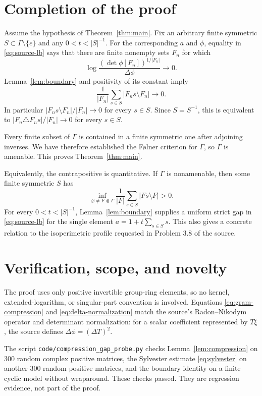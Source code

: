 \documentclass[11pt]{article}
\newcommand{\G}{\Gamma}
\begin{document}
\section{Completion of the proof}

Assume the hypothesis of Theorem~\ref{thm:main}.  Fix an arbitrary finite
symmetric $S\subset\G\setminus\{e\}$ and any $0<t<|S|^{-1}$.  For the
corresponding $a$ and $\phi$, equality in \eqref{eq:source-lb} says that
there are finite nonempty sets $F_n$ for which
\[
 \log\frac{(\det\phi[F_n])^{1/|F_n|}}{\Delta\phi}\longrightarrow0.
\]
Lemma~\ref{lem:boundary} and positivity of its constant imply
\[
 \frac1{|F_n|}\sum_{s\in S}|F_ns\setminus F_n|\longrightarrow0.
\]
In particular $|F_ns\setminus F_n|/|F_n|\to0$ for every $s\in S$.
Since $S=S^{-1}$, this is equivalent to
$|F_n\triangle F_ns|/|F_n|\to0$ for every $s\in S$.

Every finite subset of $\G$ is contained in a finite symmetric one after
adjoining inverses.  We have therefore established the F\o lner criterion
for $\G$, so $\G$ is amenable.  This proves Theorem~\ref{thm:main}.

Equivalently, the contrapositive is quantitative.  If $\G$ is nonamenable,
then some finite symmetric $S$ has
\[
 \inf_{\varnothing\ne F\Subset\G}
 \frac1{|F|}\sum_{s\in S}|Fs\setminus F|>0.
\]
For every $0<t<|S|^{-1}$, Lemma~\ref{lem:boundary} supplies a uniform strict
gap in \eqref{eq:source-lb} for the single element
$a=1+t\sum_{s\in S}s$.  This also gives a concrete relation to the
isoperimetric profile requested in Problem 3.8 of the source.

\section{Verification, scope, and novelty}

The proof uses only positive invertible group-ring elements, so no kernel,
extended-logarithm, or singular-part convention is involved.  Equations
\eqref{eq:gram-compression} and \eqref{eq:delta-normalization} match the
source's Radon--Nikodym operator and determinant normalization: for a scalar
coefficient represented by $T\xi$, the source defines
$\Delta\phi=(\Delta T)^2$.

The script \texttt{code/compression\_gap\_probe.py} checks
Lemma~\ref{lem:compression} on 300 random complex positive matrices, the
Sylvester estimate \eqref{eq:sylvester} on another 300 random positive
matrices, and the boundary identity on a finite cyclic model without
wraparound.  These checks passed.  They are regression evidence, not part of
the proof.
\end{document}
